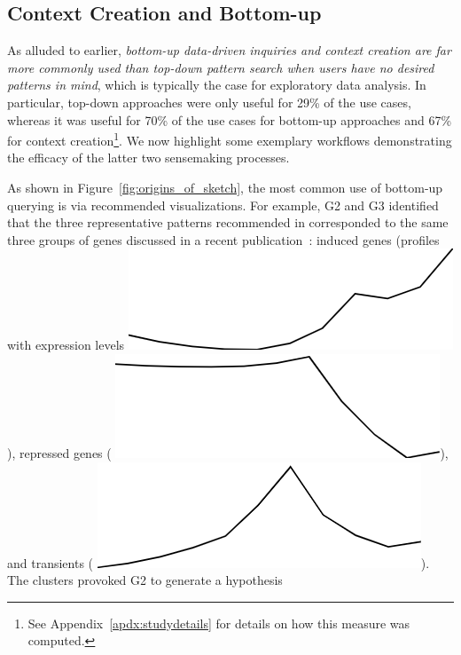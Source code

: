 \subsection{Context Creation and Bottom-up }%
\par As alluded to earlier,
\emph{bottom-up data-driven inquiries
and context creation are far more commonly
used than top-down pattern search
when users have no desired patterns in mind},
which is typically the case for exploratory data analysis.
In particular, top-down approaches
were only useful for 29\% of the use cases,
whereas it was useful for 70\% of the use cases
for bottom-up approaches and 67\%
for context creation\footnote{See Appendix~\ref{apdx:studydetails} for details on how this measure was computed.}. We now highlight some exemplary workflows demonstrating the efficacy of the latter two sensemaking processes.
\par As shown in Figure~\ref{fig:origins_of_sketch},
the most common use of bottom-up querying
is via recommended visualizations. For example, G2 and G3 identified that
the three representative patterns
recommended in \zvpp corresponded
to the same three groups of genes discussed
in a recent publication~\cite{Gloss2017}:
induced genes (profiles with expression levels  \includegraphics[width=2\baselineskip,keepaspectratio]{figures/induced.png}),
repressed genes ( \includegraphics[width=2\baselineskip,keepaspectratio]{figures/repressed.png}),
and transients ( \includegraphics[width=2\baselineskip,keepaspectratio]{figures/transient.png}). The clusters provoked G2 to generate a hypothesis
